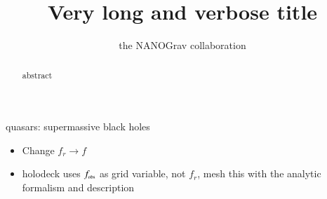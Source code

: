 %
%
%






\def\oldbibitem{} \let\oldbibitem=\bibitem
\def\bibitem{\stepcounter{citnum}\oldbibitem}

\newcommand{\orcidauthorA}{0000-0002-6625-6450} %

\title[Short Title]{Very long and verbose title}
\author[NANOGrav]{the NANOGrav collaboration}




\maketitle

\begin{abstract}
    abstract
\end{abstract}

\begin{keywords}
    quasars: supermassive black holes
\end{keywords}



\begin{itemize}
    \item Change $f_r \rightarrow f$
    \item holodeck uses $f_\trt{obs}$ as grid variable, not $f_r$, mesh this with the analytic formalism and description
\end{itemize}


